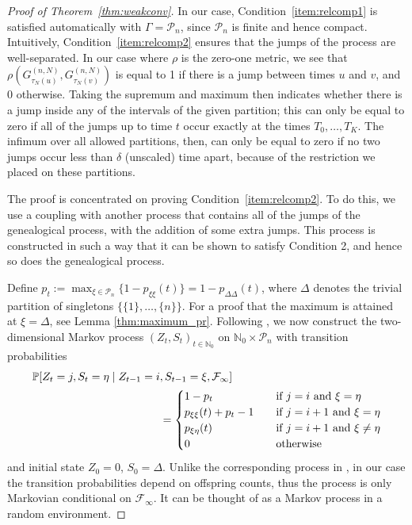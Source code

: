 \begin{proof}[Proof of Theorem~\ref{thm:weakconv}]
In our case, Condition~\ref{item:relcomp1} is satisfied automatically with $\Gamma = \mathcal{P}_n$, since $\mathcal{P}_n$ is finite and hence compact. 
Intuitively, Condition~\ref{item:relcomp2} ensures that the jumps of the process are well-separated. 
In our case where $\rho$ is the zero-one metric, we see that $\rho( G_{\tau_N(u)}^{(n,N)}, G_{\tau_N(v)}^{(n,N)} )$ is equal to 1 if there is a jump between times $u$ and $v$, and 0 otherwise.
Taking the supremum and maximum then indicates whether there is a jump inside any of the intervals of the given partition; this can only be equal to zero if all of the jumps up to time $t$ occur exactly at the times $T_0, \dots, T_K$. 
The infimum over all allowed partitions, then, can only be equal to zero if no two jumps occur less than $\delta$ (unscaled) time apart, because of the restriction we placed on these partitions.

The proof is concentrated on proving Condition~\ref{item:relcomp2}.
To do this, we use a coupling with another process that contains all of the jumps of the genealogical process, with the addition of some extra jumps. This process is constructed in such a way that it can be shown to satisfy Condition 2, and hence so does the genealogical process.

Define $p_t := \max_{\xi\in \mathcal{P}_n} \{1 - p_{\xi\xi}(t)\} = 1 - p_{\Delta\Delta}(t)$, where $\Delta$ denotes the trivial partition of singletons $\{ \{1\},\dots, \{n\} \}$. For a proof that the maximum is attained at $\xi = \Delta$, see Lemma \ref{thm:maximum_pr}. 
Following \textcite{mohle1999}, we now construct the two-dimensional Markov process $(Z_t, S_t)_{t \in \mathbb{N}_0}$ on $\mathbb{N}_0 \times \mathcal{P}_n$ with transition probabilities
\begin{align*}
\mathbb{P}[ Z_t = j , S_t = \eta \mid Z_{t-1} = i&, S_{t-1} = \xi, \mathcal{F}_\infty] \\
&= \begin{cases}
1 - p_t &\quad \text{if } j=i \text{ and } \xi=\eta \\
p_{\xi\xi}(t) + p_t - 1  &\quad \text{if } j=i+1 \text{ and } \xi=\eta \\
p_{\xi\eta}(t) &\quad \text{if } j=i+1 \text{ and } \xi\neq\eta \\
0 &\quad \text{otherwise} 
\end{cases}
\end{align*}
and initial state $Z_0=0$, $S_0 = \Delta$.
Unlike the corresponding process in \textcite{mohle1999}, in our case the transition probabilities depend on offspring counts, thus the process is only Markovian conditional on $\mathcal{F}_\infty$. It can be thought of as a Markov process in a random environment.


\end{proof}
